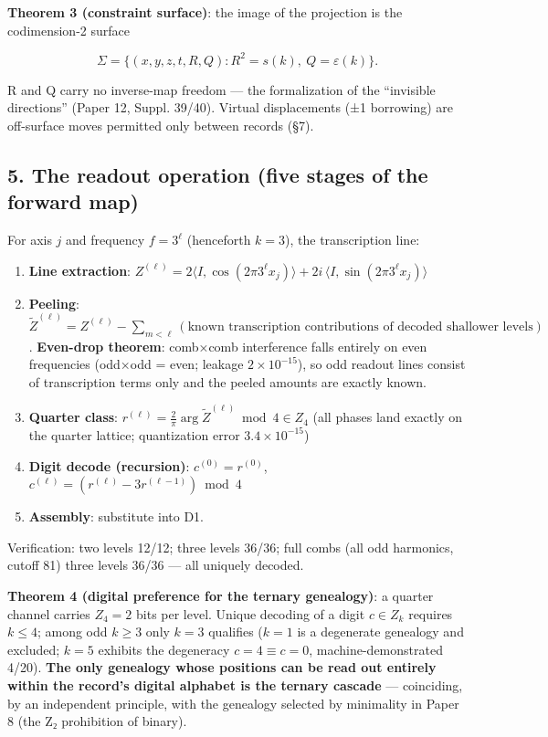 \documentclass[
]{ltjsarticle}
\providecommand{\tightlist}{%
  \setlength{\itemsep}{0pt}\setlength{\parskip}{0pt}}
\begin{document}
\textbf{Theorem 3 (constraint surface)}: the image of the projection is
the codimension-2 surface

\[
\Sigma=\bigl\{(x,y,z,t,R,Q): R^2=s(k),\ Q=\varepsilon(k)\bigr\}.
\]

R and Q carry no inverse-map freedom --- the formalization of the
``invisible directions'' (Paper 12, Suppl. 39/40). Virtual displacements
(±1 borrowing) are off-surface moves permitted only between records
(§7).

\subsection{5. The readout operation (five stages of the forward
map)}\label{the-readout-operation-five-stages-of-the-forward-map}

For axis \(j\) and frequency \(f=3^\ell\) (henceforth \(k=3\)), the
transcription line:

\begin{enumerate}
\def\labelenumi{\arabic{enumi}.}
\tightlist
\item
  \textbf{Line extraction}:
  \(Z^{(\ell)}=2\langle I,\cos(2\pi 3^\ell x_j)\rangle+2i\,\langle I,\sin(2\pi 3^\ell x_j)\rangle\)
\item
  \textbf{Peeling}:
  \(\tilde Z^{(\ell)}=Z^{(\ell)}-\sum_{m<\ell}(\text{known transcription contributions of decoded shallower levels})\).
  \textbf{Even-drop theorem}: comb×comb interference falls entirely on
  even frequencies (odd×odd = even; leakage \(2\times10^{-15}\)), so odd
  readout lines consist of transcription terms only and the peeled
  amounts are exactly known.
\item
  \textbf{Quarter class}:
  \(r^{(\ell)}=\frac{2}{\pi}\arg\tilde Z^{(\ell)}\bmod 4\in Z_4\) (all
  phases land exactly on the quarter lattice; quantization error
  \(3.4\times10^{-15}\))
\item
  \textbf{Digit decode (recursion)}: \(c^{(0)}=r^{(0)}\),
  \(c^{(\ell)}=(r^{(\ell)}-3r^{(\ell-1)})\bmod4\)
\item
  \textbf{Assembly}: substitute into D1.
\end{enumerate}

Verification: two levels 12/12; three levels 36/36; full combs (all odd
harmonics, cutoff 81) three levels 36/36 --- all uniquely decoded.

\textbf{Theorem 4 (digital preference for the ternary genealogy)}: a
quarter channel carries \(Z_4=2\) bits per level. Unique decoding of a
digit \(c\in Z_k\) requires \(k\le4\); among odd \(k\ge3\) only \(k=3\)
qualifies (\(k{=}1\) is a degenerate genealogy and excluded; \(k{=}5\)
exhibits the degeneracy \(c{=}4\equiv c{=}0\), machine-demonstrated
4/20). \textbf{The only genealogy whose positions can be read out
entirely within the record's digital alphabet is the ternary cascade}
--- coinciding, by an independent principle, with the genealogy selected
by minimality in Paper 8 (the Z₂ prohibition of binary).
\end{document}
